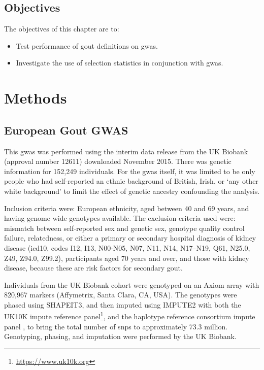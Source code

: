 \documentclass[twoside,openright]{report}
\providecommand{\tightlist}{%
  \setlength{\itemsep}{0pt}\setlength{\parskip}{0pt}}
\begin{document}
\subsection{Objectives}\label{objectives-2}

The objectives of this chapter are to:

\begin{itemize}
\tightlist
\item
  Test performance of gout definitions on \gls{gwas}.
\item
  Investigate the use of selection statistics in conjunction with
  \gls{gwas}.
\end{itemize}

\section{Methods}\label{methods-2}

\subsection{European Gout GWAS}\label{ukbbgwas}

This \gls{gwas} was performed using the interim data release from the UK
Biobank (approval number 12611) downloaded November 2015. There was
genetic information for 152,249 individuals. For the \gls{gwas} itself,
it was limited to be only people who had self-reported an ethnic
background of British, Irish, or `any other white background' to limit
the effect of genetic ancestry confounding the analysis.

Inclusion criteria were: European ethnicity, aged between 40 and 69
years, and having genome wide genotypes available. The exclusion
criteria used were: mismatch between self-reported sex and genetic sex,
genotype quality control failure, relatedness, or either a primary or
secondary hospital diagnosis of kidney disease (\gls{icd10}, codes I12,
I13, N00-N05, N07, N11, N14, N17--N19, Q61, N25.0, Z49, Z94.0, Z99.2),
participants aged 70 years and over, and those with kidney disease,
because these are risk factors for secondary gout.

Individuals from the UK Biobank cohort were genotyped on an Axiom array
with 820,967 markers (Affymetrix, Santa Clara, CA, USA). The genotypes
were phased using SHAPEIT3, and then imputed using IMPUTE2 with both the
UK10K impute reference panel\footnote{\url{https://www.uk10k.org}}, and
the haplotype reference consortium impute panel \citep{McCarthy2016}, to
bring the total number of \glspl{snp} to approximately 73.3 million.
Genotyping, phasing, and imputation were performed by the UK Biobank.
\end{document}
